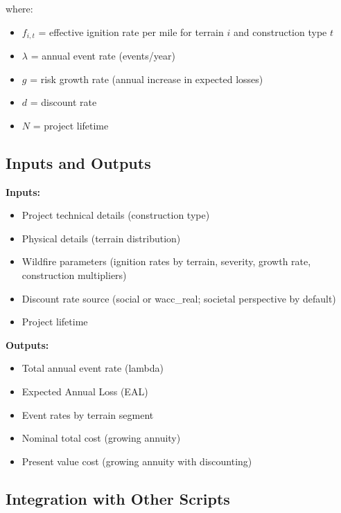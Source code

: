 \documentclass[ctcc_full_documentation.tex]{subfiles}
\begin{document}
where:
\begin{itemize}
    \item $f_{i,t}$ = effective ignition rate per mile for terrain $i$ and construction type $t$
    \item $\lambda$ = annual event rate (events/year)
    \item $g$ = risk growth rate (annual increase in expected losses)
    \item $d$ = discount rate
    \item $N$ = project lifetime
\end{itemize}

\subsection{Inputs and Outputs}

\textbf{Inputs:}
\begin{itemize}
    \item Project technical details (construction type)
    \item Physical details (terrain distribution)
    \item Wildfire parameters (ignition rates by terrain, severity, growth rate, construction multipliers)
    \item Discount rate source (social or wacc\_real; societal perspective by default)
    \item Project lifetime
\end{itemize}

\textbf{Outputs:}
\begin{itemize}
    \item Total annual event rate (lambda)
    \item Expected Annual Loss (EAL)
    \item Event rates by terrain segment
    \item Nominal total cost (growing annuity)
    \item Present value cost (growing annuity with discounting)
\end{itemize}

\subsection{Integration with Other Scripts}
\end{document}
